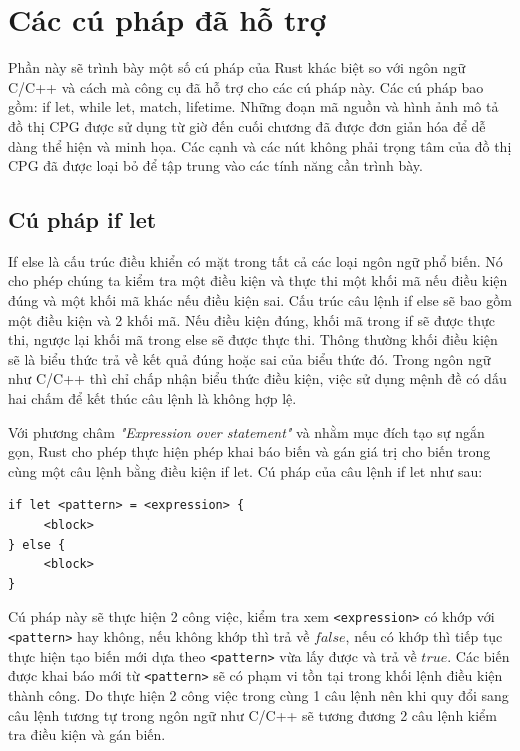 \section{Các cú pháp đã hỗ trợ}

Phần này sẽ trình bày một số cú pháp của Rust khác biệt so với ngôn ngữ C/C++ và cách mà công cụ đã hỗ trợ cho các cú pháp này.
Các cú pháp bao gồm: if let, while let, match, lifetime.
Những đoạn mã nguồn và hình ảnh mô tả đồ thị CPG được sử dụng từ giờ đến cuối chương đã được đơn giản hóa để dễ dàng thể hiện và minh họa.
Các cạnh và các nút không phải trọng tâm của đồ thị CPG đã được loại bỏ để tập trung vào các tính năng cần trình bày.

\subsection{Cú pháp if let}
If else là cấu trúc điều khiển có mặt trong tất cả các loại ngôn ngữ phổ biến.
Nó cho phép chúng ta kiểm tra một điều kiện và thực thi một khối mã nếu điều kiện đúng và một khối mã khác nếu điều kiện sai.
Cấu trúc câu lệnh if else sẽ bao gồm một điều kiện và 2 khối mã.
Nếu điều kiện đúng, khối mã trong if sẽ được thực thi, ngược lại khối mã trong else sẽ được thực thi.
Thông thường khối điều kiện sẽ là biểu thức trả về kết quả đúng hoặc sai của biểu thức đó.
Trong ngôn ngữ như C/C++ thì chỉ chấp nhận biểu thức điều kiện, việc sử dụng mệnh đề có dấu hai chấm để kết thúc câu lệnh là không hợp lệ.

Với phương châm \textit{"Expression over statement"} và nhằm mục đích tạo sự ngắn gọn, Rust cho phép thực hiện phép khai báo biến và gán giá trị cho biến trong cùng một câu lệnh bằng điều kiện if let.
Cú pháp của câu lệnh if let như sau:

\begin{verbatim}
if let <pattern> = <expression> {
     <block>
} else {
     <block>
}
\end{verbatim}


Cú pháp này sẽ thực hiện 2 công việc, kiểm tra xem \texttt{<expression>} có khớp với \texttt{<pattern>} hay không, nếu không khớp thì trả về $false$, nếu có khớp thì tiếp tục thực hiện tạo biến mới dựa theo \texttt{<pattern>} vừa lấy được và trả về $true$.
Các biến được khai báo mới từ \texttt{<pattern>} sẽ có phạm vi tồn tại trong khối lệnh điều kiện thành công.
Do thực hiện 2 công việc trong cùng 1 câu lệnh nên khi quy đổi sang câu lệnh tương tự trong ngôn ngữ như C/C++ sẽ tương đương 2 câu lệnh kiểm tra điều kiện và gán biến.


